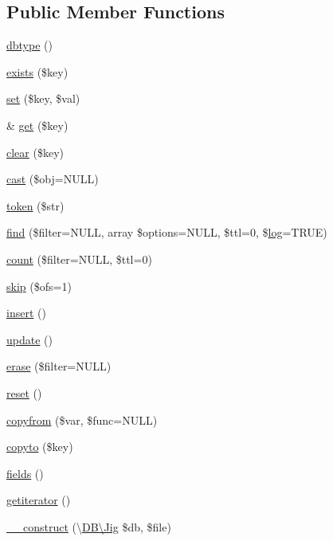 \subsection*{Public Member Functions}
\begin{DoxyCompactItemize}
\item 
\hyperlink{class_d_b_1_1_jig_1_1_mapper_a38948c2fb1711f49b72f123cbd91e611}{dbtype} ()
\item 
\hyperlink{class_d_b_1_1_jig_1_1_mapper_ace1ae5be37bf26c172cc7ea4e1a65e26}{exists} (\$key)
\item 
\hyperlink{class_d_b_1_1_jig_1_1_mapper_ac8d8012023e560c81f55a629022cb65a}{set} (\$key, \$val)
\item 
\& \hyperlink{class_d_b_1_1_jig_1_1_mapper_ac3695923790b06917410e205068b8376}{get} (\$key)
\item 
\hyperlink{class_d_b_1_1_jig_1_1_mapper_a10a949ef75de6c82c98ac555f371ba83}{clear} (\$key)
\item 
\hyperlink{class_d_b_1_1_jig_1_1_mapper_aa33294a722f17e6e4946223bb73f13ab}{cast} (\$obj=N\+U\+LL)
\item 
\hyperlink{class_d_b_1_1_jig_1_1_mapper_a0a17b08b524058f3c3ce29d0985e83d6}{token} (\$str)
\item 
\hyperlink{class_d_b_1_1_jig_1_1_mapper_ad2b647dea97780ff7a831670ff6ba7dc}{find} (\$filter=N\+U\+LL, array \$options=N\+U\+LL, \$ttl=0, \$\hyperlink{class_d_b_1_1_jig_a92faa80a7077936bd630e5dcc7bb4a64}{log}=T\+R\+UE)
\item 
\hyperlink{class_d_b_1_1_jig_1_1_mapper_ab1f3a3bd85dca49dceaea57f2fe21abf}{count} (\$filter=N\+U\+LL, \$ttl=0)
\item 
\hyperlink{class_d_b_1_1_jig_1_1_mapper_aad399d205074eaeed711d5e0157b3c0a}{skip} (\$ofs=1)
\item 
\hyperlink{class_d_b_1_1_jig_1_1_mapper_a473241246338cfccc4709ba896749019}{insert} ()
\item 
\hyperlink{class_d_b_1_1_jig_1_1_mapper_a842e4774e3b3601a005b995c02f7e883}{update} ()
\item 
\hyperlink{class_d_b_1_1_jig_1_1_mapper_aa7210074cfc1eda78dc492d8b8a96616}{erase} (\$filter=N\+U\+LL)
\item 
\hyperlink{class_d_b_1_1_jig_1_1_mapper_a4a20559544fdf4dcb457e258dc976cf8}{reset} ()
\item 
\hyperlink{class_d_b_1_1_jig_1_1_mapper_adffe904ab38af888d9b033647ec6d935}{copyfrom} (\$var, \$func=N\+U\+LL)
\item 
\hyperlink{class_d_b_1_1_jig_1_1_mapper_a4bcf54f913758fb093c35ea81fc29615}{copyto} (\$key)
\item 
\hyperlink{class_d_b_1_1_jig_1_1_mapper_a9dfc1601eaf8348bed6ba5622f725971}{fields} ()
\item 
\hyperlink{class_d_b_1_1_jig_1_1_mapper_a7f835c25df4cb49d02328644722656da}{getiterator} ()
\item 
\hyperlink{class_d_b_1_1_jig_1_1_mapper_a19fc308235f36411d08e0c019cddc0ad}{\+\_\+\+\_\+construct} (\textbackslash{}\hyperlink{class_d_b_1_1_jig}{D\+B\textbackslash{}\+Jig} \$db, \$file)
\end{DoxyCompactItemize}
